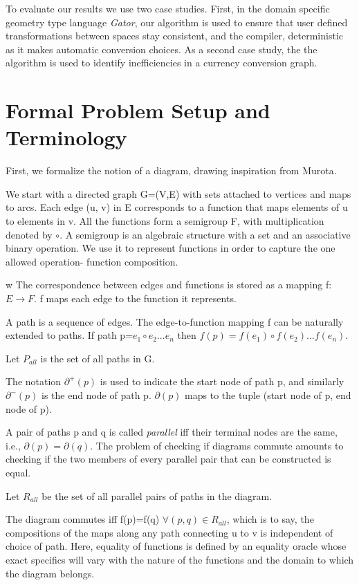 \documentclass{article}
\begin{document}
To evaluate our results we use two case studies.
First, in the domain specific geometry type language \textit{Gator}, our algorithm is used to ensure that user defined transformations between spaces stay consistent, and the compiler, deterministic as it makes automatic conversion choices. As a second case study, the the algorithm is used to identify inefficiencies in a currency conversion graph.

\section{Formal Problem Setup and Terminology}

First, we formalize the notion of a diagram, drawing inspiration from Murota\cite{commutative}.

We start with a directed graph G=(V,E) with sets attached to vertices and maps to arcs. Each edge (u, v) in E corresponds to a function that maps elements of u to elements in v.
All the functions form a semigroup F, with multiplication denoted by $\circ$.
A semigroup is an algebraic structure with a set and an associative binary operation. We use it to represent functions in order to capture the one allowed operation- function composition.

w
The correspondence between edges and functions is stored as a mapping f:$E\rightarrow F$. f maps each edge to the function it represents.

A path is a sequence of edges. The edge-to-function mapping f can be naturally extended to paths. If path p=$e_1\circ e_2 ... e_n$ then $f(p)=f(e_1) \circ f(e_2) ... f(e_n)$.

Let $P_{all}$ is the set of all paths in G.

The notation $\partial^{+}(p)$ is used to indicate the start node of path p, and similarly $\partial^-(p)$ is the end node of path p. $\partial(p)$ maps to the tuple (start node of p, end node of p).

A pair of paths p and q is called \textit{parallel} iff their terminal nodes are the same, i.e., $\partial(p)=\partial(q)$.
The problem of checking if diagrams commute amounts to checking if the two members of every parallel pair that can be constructed is equal.

Let $R_{all}$ be the set of all parallel pairs of paths in the diagram.

The diagram commutes iff f(p)=f(q) $\forall (p,q)\in R_{all}$, which is to say, the compositions of the maps along any path connecting u to v is independent of choice of path. Here, equality of functions is defined by an equality oracle whose exact specifics will vary with the nature of the functions and the domain to which the diagram belongs.
\end{document}
